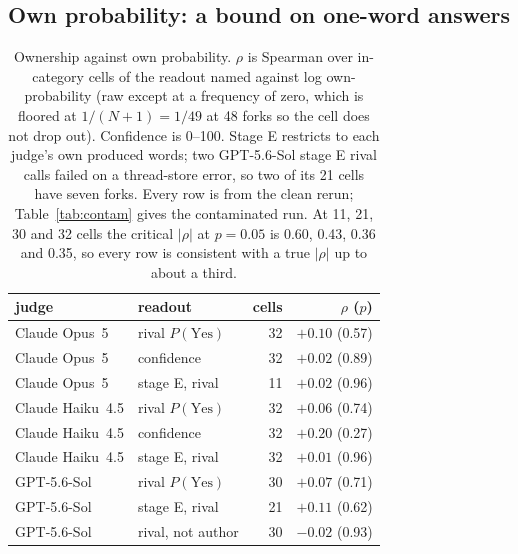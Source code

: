\documentclass[twocolumn,10pt]{article}
\newcommand{\pyes}{P(\mathrm{Yes})}
\newcommand{\opus}{Claude Opus~5}
\newcommand{\haiku}{Claude Haiku~4.5}
\newcommand{\gpt}{GPT-5.6-Sol}
\begin{document}
\subsection{Own probability: a bound on one-word answers}
\label{sec:likelihood}

\begin{table}[t]
\centering\small
\caption{Ownership against own probability. $\rho$ is Spearman over in-category cells of the readout named against log own-probability (raw except at a frequency of zero, which is floored at $1/(N+1) = 1/49$ at 48 forks so the cell does not drop out). Confidence is 0--100. Stage E restricts to each judge's own produced words; two \gpt{} stage E rival calls failed on a thread-store error, so two of its 21 cells have seven forks. Every row is from the clean rerun; Table~\ref{tab:contam} gives the contaminated run. At 11, 21, 30 and 32 cells the critical $|\rho|$ at $p=0.05$ is 0.60, 0.43, 0.36 and 0.35, so every row is consistent with a true $|\rho|$ up to about a third.}
\label{tab:rho}\footnotesize\setlength{\tabcolsep}{4pt}
\begin{tabular}{llrr}
\toprule
judge & readout & cells & $\rho$ ($p$) \\
\midrule
\opus{} & rival $\pyes$ & 32 & $+0.10$ (0.57) \\
\opus{} & confidence & 32 & $+0.02$ (0.89) \\
\opus{} & stage E, rival & 11 & $+0.02$ (0.96) \\
\haiku{} & rival $\pyes$ & 32 & $+0.06$ (0.74) \\
\haiku{} & confidence & 32 & $+0.20$ (0.27) \\
\haiku{} & stage E, rival & 32 & $+0.01$ (0.96) \\
\gpt{} & rival $\pyes$ & 30 & $+0.07$ (0.71) \\
\gpt{} & stage E, rival & 21 & $+0.11$ (0.62) \\
\gpt{} & rival, not author & 30 & $-0.02$ (0.93) \\
\bottomrule
\end{tabular}
\end{table}
\end{document}
